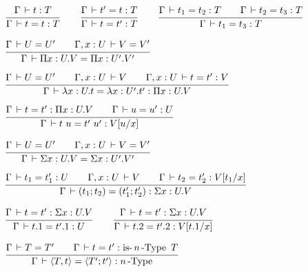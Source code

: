\documentclass[a4paper,english]{lipics-utf8x}
\begin{document}

  \begin{center}
  \(
    \ru{\Gamma \der t : T
      }{\Gamma \der t = t : T}
    \qquad
    \ru{\Gamma \der t' = t : T
      }{\Gamma \der t = t' : T}
    \qquad
    \ru{\Gamma \der t_1 = t_2 : T \qquad
        \Gamma \der t_2 = t_3 : T
      }{\Gamma \der t_1 = t_3 : T}
  \)
  \end{center}


  \begin{center}
  \(
    \ru{\Gamma \der U = U' \qquad
        \Gamma, x:U \der V = V'
      }{\Gamma \der \Pi x:U.V = \Pi x:U'.V'}
  \)
  \end{center}

  \begin{center}
  \(
    \ru{\Gamma \der U = U' \qquad
        \Gamma, x:U \der V \qquad
        \Gamma, x:U \der t = t' : V
      }{\Gamma \der \lambda x:U.t = \lambda x:U'.t' : \Pi x:U.V}
  \)
  \end{center}

  \begin{center}
  \(
    \ru{\Gamma \der t = t' : \Pi x:U.V \qquad
        \Gamma \der u = u' : U
      }{\Gamma \der t~u = t'~u' : V[u/x]}
  \)
  \end{center}

  \begin{center}
  \(
    \ru{\Gamma \der U = U' \qquad
        \Gamma, x:U \der V = V'
      }{\Gamma \der \Sigma x:U.V = \Sigma x:U'.V'}
  \)
  \end{center}

  \begin{center}
  \(
    \ru{\Gamma \der t_1 = t'_1 : U \qquad
        \Gamma, x:U \der V \qquad
        \Gamma \der t_2 = t'_2 : V[t_1/x]
      }{\Gamma \der (t_1;t_2) = (t'_1;t'_2) : \Sigma x:U.V}
  \)
  \end{center}

  \begin{center}
  \(
    \ru{\Gamma \der t = t' : \Sigma x:U.V
      }{\Gamma \der t.1 = t'.1 : U}
    \qquad
    \ru{\Gamma \der t = t' : \Sigma x:U.V
      }{\Gamma \der t.2 = t'.2 : V[t.1/x]}
  \)
  \end{center}

  \begin{center}
  \(
    \ru{\Gamma \der T = T' \qquad
        \Gamma \der t = t' : \isnType{n}{T}
      }{\Gamma \der \hsig{T,t} = \hsig{T';t'} : \nType{n}}
  \)
  \end{center}
\end{document}
